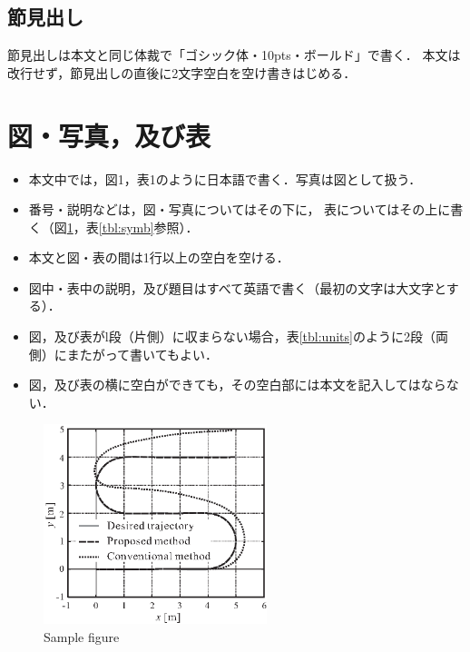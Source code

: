\documentclass[a4jsme]{jsmepaper}
\begin{document}
\subsection{節見出し}
節見出しは本文と同じ体裁で「ゴシック体・10pts・ボールド」で書く．
本文は改行せず，節見出しの直後に2文字空白を空け書きはじめる．

\section{図・写真，及び表}
\begin{itemize}
\item[(1)] 本文中では，図1，表1のように日本語で書く．写真は図として扱う．
\item[(2)] 番号・説明などは，図・写真についてはその下に，
           表についてはその上に書く（図\ref{fig:sample}，表\ref{tbl:symb}参照）．
\item[(3)] 本文と図・表の間は1行以上の空白を空ける．
\item[(4)] 図中・表中の説明，及び題目はすべて英語で書く（最初の文字は大文字とする）．
\item[(5)] 図，及び表がl段（片側）に収まらない場合，表\ref{tbl:units}のように2段（両側）にまたがって書いてもよい．
\item[(6)] 図，及び表の横に空白ができても，その空白部には本文を記入してはならない．
\end{itemize}
\begin{figure}[htbp]
  \begin{center}
  \vspace{1zh}
    \includegraphics[width=65mm]{figs/fig.eps}
  \end{center}
  \caption{Sample figure}
  \label{fig:sample}
\end{figure}
\end{document}

